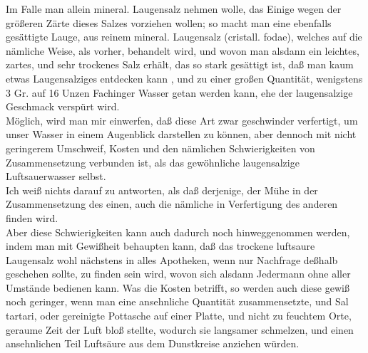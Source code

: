 \documentclass[fontsize=11pt,a5paper,twoside]{memoir}
\begin{document}
Im Falle man allein mineral. Laugensalz nehmen wolle,
das Einige wegen der größeren Zärte dieses Salzes vorziehen wollen;
so macht man eine ebenfalls gesättigte Lauge,
aus reinem mineral. Laugensalz ({\lattext cristall. fodae}),
welches auf die nämliche Weise, als vorher, behandelt wird,
und wovon man alsdann ein leichtes, zartes,
und sehr trockenes Salz erhält, das so stark gesättigt ist,
daß man kaum etwas Laugensalziges entdecken kann%
,
und zu einer großen Quantität,
wenigstens 3 Gr. auf 16 Unzen Fachinger Wasser getan werden kann,
ehe der laugensalzige Geschmack verspürt wird.\\

Möglich, wird man mir einwerfen,
daß diese Art zwar geschwinder verfertigt,
um unser Wasser in einem Augenblick darstellen zu können,
aber dennoch mit nicht geringerem Umschweif,
Kosten und den nämlichen Schwierigkeiten von Zusammensetzung verbunden ist,
als das gewöhnliche laugensalzige Luftsauerwasser selbst.\\

Ich weiß nichts darauf zu antworten,
als daß derjenige, der Mühe in der Zusammensetzung des einen,
auch die nämliche in Verfertigung des anderen finden wird.\\

Aber diese Schwierigkeiten kann auch dadurch noch hinweggenommen werden,
indem man mit Gewißheit behaupten kann,
daß das trockene luftsaure Laugensalz wohl nächstens in alles Apotheken,
wenn nur Nachfrage deßhalb geschehen sollte,
zu finden sein wird,
wovon sich alsdann Jedermann ohne aller Umstände bedienen kann.
Was die Kosten betrifft,
so werden auch diese gewiß noch geringer,
wenn man eine ansehnliche Quantität zusammensetzte,%
und {\lattext Sal tartari},
oder gereinigte Pottasche auf einer Platte,
und nicht zu feuchtem Orte,
geraume Zeit der Luft bloß stellte,
wodurch sie langsamer schmelzen,
und einen ansehnlichen Teil Luftsäure aus dem Dunstkreise anziehen würden.
\end{document}
